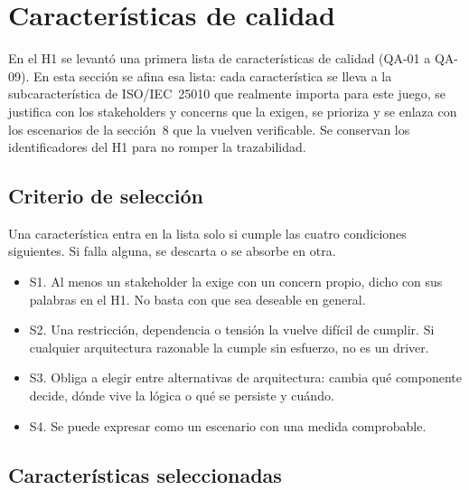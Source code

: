 \section{Características de calidad}

En el H1 se levantó una primera lista de características de calidad (QA-01 a QA-09). En esta sección se afina esa lista: cada característica se lleva a la subcaracterística de ISO/IEC~25010 que realmente importa para este juego, se justifica con los stakeholders y concerns que la exigen, se prioriza y se enlaza con los escenarios de la sección~8 que la vuelven verificable. Se conservan los identificadores del H1 para no romper la trazabilidad.

\subsection{Criterio de selección}

Una característica entra en la lista solo si cumple las cuatro condiciones siguientes. Si falla alguna, se descarta o se absorbe en otra.

\begin{itemize}
  \item S1. Al menos un stakeholder la exige con un concern propio, dicho con sus palabras en el H1. No basta con que sea deseable en general.
  \item S2. Una restricción, dependencia o tensión la vuelve difícil de cumplir. Si cualquier arquitectura razonable la cumple sin esfuerzo, no es un driver.
  \item S3. Obliga a elegir entre alternativas de arquitectura: cambia qué componente decide, dónde vive la lógica o qué se persiste y cuándo.
  \item S4. Se puede expresar como un escenario con una medida comprobable.
\end{itemize}

\subsection{Características seleccionadas}

